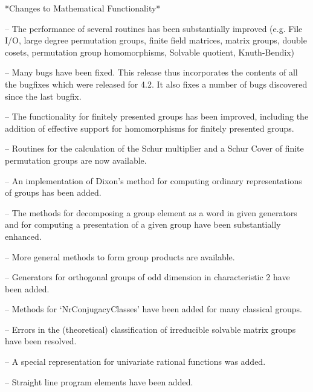 *Changes to Mathematical Functionality*

\beginlist%

\item{--}
The performance of several routines has been substantially improved (e.g.
File I/O, large degree permutation groups, finite field matrices, matrix
groups, double cosets, permutation group homomorphisms, Solvable quotient,
Knuth-Bendix)

\item{--}
Many bugs have been fixed. This release thus incorporates the contents
of all the bugfixes which were released for {\GAP} 4.2. It also fixes
a number of bugs discovered since the last bugfix.


\item{--}
The functionality for finitely presented groups has been improved, including 
the addition of effective support for homomorphisms for finitely presented groups.

\item{--}
Routines for the calculation of the Schur multiplier and a
Schur Cover of finite permutation groups are now available.

\item{--}
An implementation of Dixon's method for computing ordinary representations of groups has been added.

\item{--}
The methods for decomposing a group element as a word in  given generators and for
computing a presentation of a given group have been substantially enhanced.

\item{--}
More general methods to form group products are available.

\item{--}
Generators for orthogonal groups of odd dimension in characteristic 2 have been added.

\item{--}
Methods for `NrConjugacyClasses' have been added for many classical groups.

\item{--}
Errors in the (theoretical) classification of irreducible solvable matrix
groups have been resolved.

\item{--}
A special representation for univariate rational functions was added.

\item{--}
Straight line program elements have been added.

